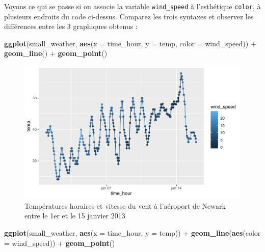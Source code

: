 \documentclass[a4paperpaper,]{article}
\newenvironment{Shaded}{\begin{snugshade}}{\end{snugshade}}
\newcommand{\DataTypeTok}[1]{\textcolor[rgb]{0.00,0.34,0.68}{#1}}
\newcommand{\KeywordTok}[1]{\textcolor[rgb]{0.12,0.11,0.11}{\textbf{#1}}}
\newcommand{\NormalTok}[1]{\textcolor[rgb]{0.12,0.11,0.11}{#1}}
\newcommand{\OperatorTok}[1]{\textcolor[rgb]{0.12,0.11,0.11}{#1}}
\newcommand{\StringTok}[1]{\textcolor[rgb]{0.75,0.01,0.01}{#1}}
\theoremstyle{definition}
\theoremstyle{definition}
\theoremstyle{definition}
\theoremstyle{remark}
\begin{document}
Voyons ce qui se passe si on associe la variable \texttt{wind\_speed} à
l'esthétique \texttt{color}, à plusieurs endroits du code ci-dessus.
Comparez les trois syntaxes et observez les différences entre les 3
graphiques obtenus :

\begin{Shaded}
\begin{Highlighting}[]
\KeywordTok{ggplot}\NormalTok{(small_weather, }\KeywordTok{aes}\NormalTok{(}\DataTypeTok{x =}\NormalTok{ time_hour, }\DataTypeTok{y =}\NormalTok{ temp, }\DataTypeTok{color =}\NormalTok{ wind_speed)) }\OperatorTok{+}
\StringTok{  }\KeywordTok{geom_line}\NormalTok{() }\OperatorTok{+}
\StringTok{  }\KeywordTok{geom_point}\NormalTok{()}
\end{Highlighting}
\end{Shaded}

\begin{figure}[htpb]

{\centering \includegraphics[width=0.9\linewidth]{figure/wind-1} 

}

\caption{Températures horaires et vitesse du vent à l'aéroport de Newark entre le 1er et le 15 janvier 2013}\label{fig:wind}
\end{figure}

\begin{Shaded}
\begin{Highlighting}[]
\KeywordTok{ggplot}\NormalTok{(small_weather, }\KeywordTok{aes}\NormalTok{(}\DataTypeTok{x =}\NormalTok{ time_hour, }\DataTypeTok{y =}\NormalTok{ temp)) }\OperatorTok{+}
\StringTok{  }\KeywordTok{geom_line}\NormalTok{(}\KeywordTok{aes}\NormalTok{(}\DataTypeTok{color =}\NormalTok{ wind_speed)) }\OperatorTok{+}
\StringTok{  }\KeywordTok{geom_point}\NormalTok{()}
\end{Highlighting}
\end{Shaded}
\end{document}
